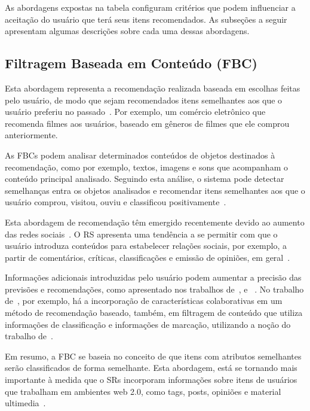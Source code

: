 As abordagens expostas na tabela configuram critérios que podem influenciar a aceitação do usuário que terá seus itens recomendados. As subseções a seguir apresentam algumas descrições sobre cada uma dessas abordagens.

\subsection{Filtragem Baseada em Conteúdo (FBC)}

Esta abordagem representa a recomendação realizada baseada em escolhas feitas pelo usuário, de modo que sejam recomendados itens semelhantes aos que o usuário preferiu no passado~\cite{lang1995newsweeder}. Por exemplo, um comércio eletrônico que recomenda filmes aos usuários, baseado em gêneros de filmes que ele comprou anteriormente.

As FBCs podem analisar determinados conteúdos de objetos destinados à recomendação, como por exemplo, textos, imagens e sons que acompanham o conteúdo principal analisado. Seguindo esta análise, o sistema pode detectar semelhanças entra os objetos analisados e recomendar itens semelhantes aos que o usuário comprou, visitou, ouviu e classificou positivamente~\cite{paulson2003combining}. 

Esta abordagem de recomendação têm emergido recentemente devido ao aumento das redes sociais~\cite{bobadilla2013recommender}. O RS apresenta uma tendência a se permitir com que o usuário introduza conteúdos para estabelecer relações sociais, por exemplo, a partir de comentários, críticas, classificações e emissão de opiniões, em geral~\cite{arazy2009improving}. 

Informações adicionais introduzidas pelo usuário podem aumentar a precisão das previsões e recomendações, como apresentado nos trabalhos de~\cite{kim2011collaborative}, \cite{zheng2011recommender} e ~\cite{carrer2012social}. No trabalho de~\cite{kim2011collaborative}, por exemplo, há a incorporação de características colaborativas em um método de recomendação baseado, também, em filtragem de conteúdo que utiliza informações de classificação e informações de marcação, utilizando a noção do trabalho de~\cite{de2008integrating}.

Em resumo, a FBC se baseia no conceito de que itens com atributos semelhantes serão classificados de forma semelhante. Esta abordagem, está se tornando mais importante à medida que o SRs incorporam informações sobre itens de usuários que trabalham em ambientes web 2.0, como tags, posts, opiniões e material ultimedia~\cite{bobadilla2013recommender}.

